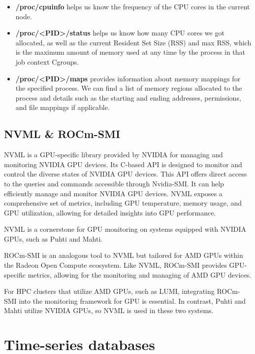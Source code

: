 \begin{itemize}
    \item \textbf{/proc/cpuinfo} helps us know the frequency of the CPU cores in the current node.
    \item \textbf{/proc/<PID>/status} helps us know how many CPU cores we got allocated, as well as the current Resident Set Size (RSS) and max RSS, which is the maximum amount of memory used at any time by the process in that job context Cgroups.
    \item \textbf{/proc/<PID>/maps} provides information about memory mappings for the specified process. We can find a list of memory regions allocated to the process and details such as the starting and ending addresses, permissions, and file mappings if applicable.
\end{itemize}

\subsection{NVML \& ROCm-SMI}
NVML \cite{nvml} is a GPU-specific library provided by NVIDIA for managing and monitoring NVIDIA GPU devices. Its C-based API is designed to monitor and control the diverse states of NVIDIA GPU devices. This API offers direct access to the queries and commands accessible through Nvidia-SMI. It can help efficiently manage and monitor NVIDIA GPU devices. NVML exposes a comprehensive set of metrics, including GPU temperature, memory usage, and GPU utilization, allowing for detailed insights into GPU performance.

NVML is a cornerstone for GPU monitoring on systems equipped with NVIDIA GPUs, such as Puhti and Mahti.

ROCm-SMI \cite{rocm-smi} is an analogous tool to NVML but tailored for AMD GPUs within the Radeon Open Compute ecosystem. Like NVML, ROCm-SMI provides GPU-specific metrics, allowing for the monitoring and managing of AMD GPU devices.

For HPC clusters that utilize AMD GPUs, such as LUMI, integrating ROCm-SMI into the monitoring framework for GPU is essential. In contrast, Puhti and Mahti utilize NVIDIA GPUs, so NVML is used in these two systems.

\section{Time-series databases}


